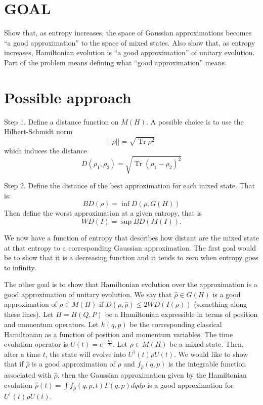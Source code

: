 \documentclass[11pt]{article}
\DeclareMathOperator{\Tr}{Tr}
\begin{document}
\section{GOAL}

Show that, as entropy increases, the space of Gaussian approximations becomes ``a good approximation'' to the space of mixed states. Also show that, as entropy increases, Hamiltonian evolution is ``a good approximation'' of unitary evolution. Part of the problem means defining what ``good approximation'' means.

\section{Possible approach}

Step 1. Define a distance function on $M(H)$. A possible choice is to use the Hilbert-Schmidt norm
\begin{equation}
	||\rho|| = \sqrt{\Tr \rho^2}
\end{equation}
which induces the distance
\begin{equation}
	D(\rho_1, \rho_2) = \sqrt{\Tr (\rho_1 - \rho_2)^2}
\end{equation}

Step 2. Define the distance of the best approximation for each mixed state. That is:
\begin{equation}
	BD(\rho) = \inf D(\rho, G(H))
\end{equation}
Then define the worst approximation at a given entropy, that is
\begin{equation}
	WD(I) = \sup BD(M(I)).
\end{equation}

We now have a function of entropy that describes how distant are the mixed state at that entropy to a corresponding Gaussian approximation. The first goal would be to show that it is a decreasing function and it tends to zero when entropy goes to infinity.

The other goal is to show that Hamiltonian evolution over the approximation is a good approximation of unitary evolution. We say that $\hat{\rho} \in G(H)$ is a good approximation of $\rho \in M(H)$ if $D(\rho, \hat{\rho}) \leq 2 WD(I(\rho))$ (something along these lines). Let $H = H(Q,P)$ be a Hamiltonian expressible in terms of position and momentum operators. Let $h(q,p)$ be the corresponding classical Hamiltonian as a function of position and momentum variables. The time evolution operator is $U(t)= e^{\imath \frac{Ht}{\hbar}}$. Let $\rho \in M(H)$ be a mixed state. Then, after a time $t$, the state will evolve into $U^\dagger(t) \rho U(t)$. We would like to show that if $\hat{\rho}$ is a good approximation of $\rho$ and $f_{\hat{\rho}}(q,p)$ is the integrable function associated with $\hat{\rho}$, then the Gaussian approximation given by the Hamiltonian evolution $\hat{\rho}(t) = \int f_{\hat{\rho}}(q,p,t) \Gamma(q,p) dq dp$ is a good approximation for $U^\dagger(t) \rho U(t)$.
\end{document}
